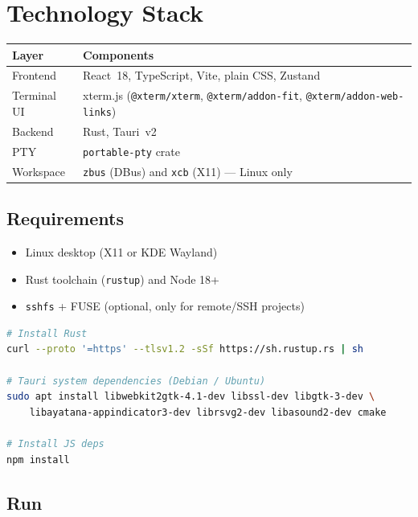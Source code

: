 \documentclass[11pt,a4paper]{article}
\newcommand{\code}[1]{\texttt{#1}}
\begin{document}
\section{Technology Stack}

\begin{longtable}{@{}p{4.2cm}p{10.5cm}@{}}
\toprule
\textbf{Layer} & \textbf{Components} \\
\midrule
\endhead
Frontend        & React~18, TypeScript, Vite, plain CSS, Zustand \\
Terminal UI     & xterm.js (\code{@xterm/xterm}, \code{@xterm/addon-fit}, \code{@xterm/addon-web-links}) \\
Backend         & Rust, Tauri~v2 \\
PTY             & \code{portable-pty} crate \\
Workspace       & \code{zbus} (DBus) and \code{xcb} (X11) --- Linux only \\
\bottomrule
\end{longtable}

\subsection{Requirements}

\begin{itemize}
  \item Linux desktop (X11 or KDE Wayland)
  \item Rust toolchain (\code{rustup}) and Node 18+
  \item \code{sshfs} + FUSE (optional, only for remote/SSH projects)
\end{itemize}

\begin{lstlisting}[language=bash]
# Install Rust
curl --proto '=https' --tlsv1.2 -sSf https://sh.rustup.rs | sh

# Tauri system dependencies (Debian / Ubuntu)
sudo apt install libwebkit2gtk-4.1-dev libssl-dev libgtk-3-dev \
    libayatana-appindicator3-dev librsvg2-dev libasound2-dev cmake

# Install JS deps
npm install
\end{lstlisting}

\subsection{Run}
\end{document}
